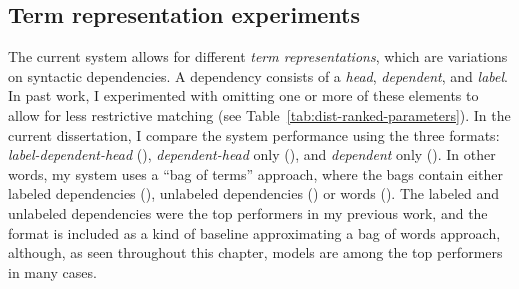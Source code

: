 \subsection{Term representation experiments}
\label{sec:exp-term-reps}
The current system allows for different \textit{term representations}, which are variations on syntactic dependencies. A dependency consists of a \textit{head}, \textit{dependent}, and \textit{label}. In past work, I experimented with omitting one or more of these elements to allow for less restrictive matching (see Table~\ref{tab:dist-ranked-parameters}). In the current dissertation, I compare the system performance using the three formats: \textit{label-dependent-head} (), \textit{dependent-head} only (), and \textit{dependent} only (). In other words, my system uses a ``bag of terms'' approach, where the bags contain either labeled dependencies (), unlabeled dependencies () or words (). The labeled and unlabeled dependencies were the top performers in my previous work, and the  format is included as a kind of baseline approximating a bag of words approach, although, as seen throughout this chapter,  models are among the top performers in many cases.

